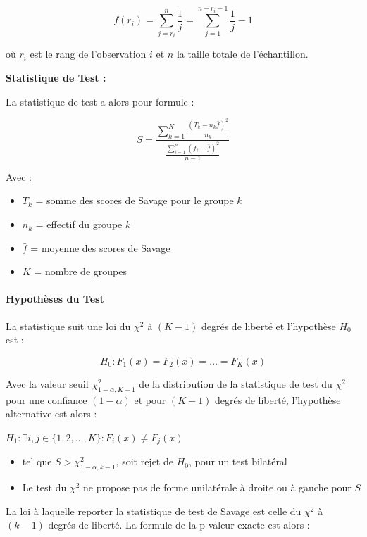 \documentclass[
  12pt,
]{article}
\providecommand{\tightlist}{%
  \setlength{\itemsep}{0pt}\setlength{\parskip}{0pt}}
\begin{document}
\[f(r_i) = \sum_{j=r_i}^{n} \frac{1}{j}  = \sum_{j=1}^{n-r_i+1} \frac{1}{j} - 1 \]

où \(r_i\) est le rang de l'observation \(i\) et \(n\) la taille totale
de l'échantillon.

\textbf{Statistique de Test :}

La statistique de test a alors pour formule :

\[S = \frac{\sum_{k=1}^{K} \frac{(T_k - n_k \bar{f})^2}{n_k}}{\frac{\sum_{i=1}^{n} (f_i - \bar{f})^2}{n-1}}\]

Avec :

\begin{itemize}
\tightlist
\item
  \(T_k\) = somme des scores de Savage pour le groupe \(k\)
\item
  \(n_k\) = effectif du groupe \(k\)
\item
  \(\bar{f}\) = moyenne des scores de Savage
\item
  \(K\) = nombre de groupes
\end{itemize}

\paragraph{Hypothèses du Test}\label{hypothuxe8ses-du-test}

La statistique suit une loi du \(\chi^2\) à \((K-1)\) degrés de liberté
et l'hypothèse \(H_0\) est :

\[H_0 : F_1(x) = F_2(x) = \ldots = F_K(x)\]

Avec la valeur seuil \(\chi^2_{1-\alpha, K-1}\) de la distribution de la
statistique de test du \(\chi^2\) pour une confiance \((1-\alpha)\) et
pour \((K-1)\) degrés de liberté, l'hypothèse alternative est alors :

\(H_1 : \exists i,j \in \{1,2,\ldots,K\} : F_i(x) \neq F_j(x)\)

\begin{itemize}
\tightlist
\item
  tel que \(S > \chi^2_{1-\alpha, k-1}\), soit rejet de \(H_0\), pour un
  test bilatéral
\item
  Le test du \(\chi^2\) ne propose pas de forme unilatérale à droite ou
  à gauche pour \(S\)
\end{itemize}

La loi à laquelle reporter la statistique de test de Savage est celle du
\(\chi^2\) à \((k-1)\) degrés de liberté. La formule de la p-valeur
exacte est alors :
\end{document}

